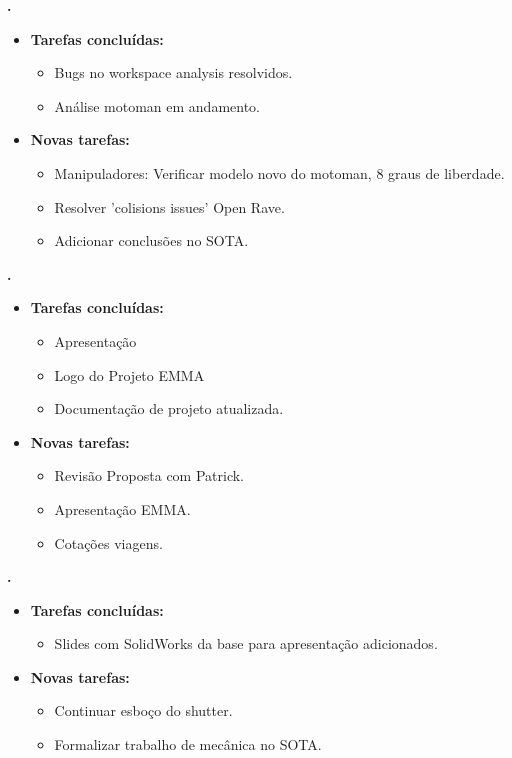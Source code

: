			
   \textbf{\gabriel.} 
	\begin{itemize}
		\item \textbf{Tarefas concluídas:}
			\begin{itemize}    
				\item Bugs no workspace analysis resolvidos.
				\item Análise motoman em andamento.
			\end{itemize}
		
		\item \textbf{Novas tarefas:}
			\begin{itemize} 
			    \item Manipuladores: Verificar modelo novo do motoman, 8 graus de
			    liberdade.
			    \item Resolver 'colisions issues' Open Rave.
				\item Adicionar conclusões no SOTA.
			\end{itemize}
	\end{itemize}
	
	   \textbf{\julia.} 
	\begin{itemize}
		\item \textbf{Tarefas concluídas:}
			\begin{itemize}    
				\item Apresentação
				\item Logo do Projeto EMMA
				\item Documentação de projeto atualizada.
			\end{itemize}
		
		\item \textbf{Novas tarefas:}
			\begin{itemize} 
			    \item Revisão Proposta com Patrick.
			    \item Apresentação EMMA. 
			    \item Cotações viagens.
			\end{itemize}
	\end{itemize}

  \textbf{.} 
	\begin{itemize}
		\item \textbf{Tarefas concluídas:}
			\begin{itemize}    
				\item Slides com SolidWorks da base para apresentação adicionados.
			\end{itemize}
		
		\item \textbf{Novas tarefas:}
			\begin{itemize} 
			    \item Continuar esboço do shutter.
			    \item Formalizar trabalho de mecânica no SOTA.
			\end{itemize}
	\end{itemize}
			




